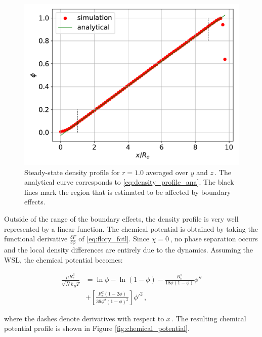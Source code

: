 \documentclass[bachelor,       %
               twoside,        %
               BCOR10mm,       %
               ngerman, english %
               ]{GAUBM}
\begin{document}
\begin{figure}[h]
  \centering
  \includegraphics[width=0.6\linewidth]{figures/density_coll_diff.pdf}
  \caption{Steady-state density profile for $r=1.0$ averaged over $y$ and $z\,$. The analytical curve corresponds to \eqref{eq:density_profile_ana}. The black lines mark the region that is estimated to be affected by boundary effects.}
  \label{fig:density_profile}
\end{figure}

Outside of the range of the boundary effects, the density profile is very well represented by a linear function. The chemical potential is obtained by taking the functional derivative $\frac{\delta F}{\delta\phi}$ of \eqref{eq:flory_fctl}. Since $\chi=0\,$, no phase separation occurs and the local density differences are entirely due to the dynamics. Assuming the WSL, the chemical potential becomes:


\begin{align}
  \frac{\mu R_e^3}{\sqrt{\bar N} k_BT}&=\ln\phi-\ln(1-\phi)-\frac{R_e^2}{18\phi(1-\phi)}\phi''\nonumber \\ &+\left[\frac{R_e^2(1-2\phi)}{36\phi^2(1-\phi)^2}\right]\phi'^2\,,
  \label{eq:mu_flory}
\end{align}

where the dashes denote derivatives with respect to $x\,.$ The resulting chemical potential profile is shown in Figure \ref{fig:chemical_potential}.
\end{document}

